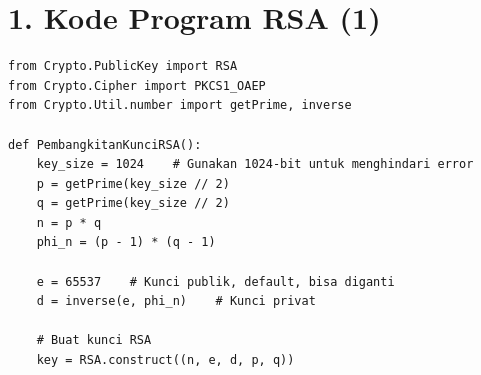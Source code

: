 \documentclass{article}
\begin{document}

\section*{1. Kode Program RSA (1)}

\begin{verbatim}
from Crypto.PublicKey import RSA
from Crypto.Cipher import PKCS1_OAEP
from Crypto.Util.number import getPrime, inverse

def PembangkitanKunciRSA():
    key_size = 1024    # Gunakan 1024-bit untuk menghindari error
    p = getPrime(key_size // 2)
    q = getPrime(key_size // 2)
    n = p * q
    phi_n = (p - 1) * (q - 1)

    e = 65537    # Kunci publik, default, bisa diganti
    d = inverse(e, phi_n)    # Kunci privat

    # Buat kunci RSA
    key = RSA.construct((n, e, d, p, q))
\end{verbatim}
\end{document}
